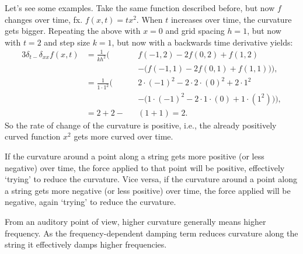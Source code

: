 Let's see some examples. Take the same function described before, but now $f$ changes over time, fx. $f(x, t)=tx^2$. When $t$ increases over time, the curvature gets bigger. Repeating the above with $x=0$ and grid spacing $h = 1$, but now with $t=2$ and step size $k=1$, but now with a backwards time derivative yields:
  \begin{alignat*}{3}
    \delta_{t-}\delta_{xx}f(x,t) &= \frac{1}{kh^2}\bigg(&&f(-1, 2) - 2f(0, 2) + f(1, 2) \\
    & &&- \Big(f(-1, 1) - 2f(0, 1) + f(1, 1)\Big)\bigg),\\
    & = \frac{1}{1\cdot 1^2}\bigg(&&2\cdot(-1)^2-2\cdot2\cdot(0)^2+2\cdot1^2\\
    & &&-\Big(1\cdot(-1)^2-2\cdot1\cdot(0)+1\cdot(1^2)\Big)\Bigg),\\
    &=2+2-&&(1+1)=2.
  \end{alignat*}
So the rate of change of the curvature is positive, i.e., the already positively curved function $x^2$ gets more curved over time.

If the curvature around a point along a string gets more positive (or less negative) over time, the force applied to that point will be positive, effectively `trying' to reduce the curvature. Vice versa, if the curvature around a point along a string gets more negative (or less positive) over time, the force applied will be negative, again `trying' to reduce the curvature. 

From an auditory point of view, higher curvature generally means higher frequency. As the frequency-dependent damping term reduces curvature along the string it effectively damps higher frequencies.
 
